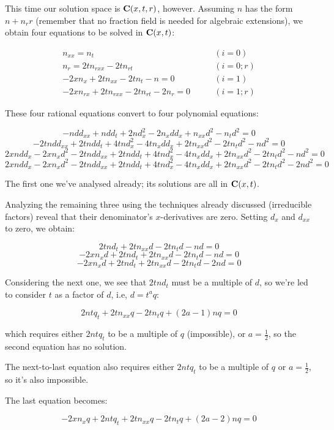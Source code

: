 \documentclass{article}
\newcommand{\C}{\ensuremath{{\bf C}}}
\begin{document}
This time our solution space is $\C(x,t,r)$, however.  Assuming $n$
has the form $n + n_r r$ (remember that no fraction field is needed
for algebraic extensions), we obtain four equations to be solved in $\C(x,t)$:

\begin{align*}
n_{xx} = n_t  & \qquad (i=0) \\
n_r = 2tn_{rxx} -2tn_{rt} & \qquad (i=0; r) \\
-2xn_{x} +2tn_{xx} -2tn_{t} -n = 0 & \qquad (i=1) \\
-2xn_{rx} +2tn_{rxx} -2tn_{rt} -2n_r = 0 & \qquad (i=1; r)
\end{align*}

These four rational equations convert to four polynomial equations:

$$-ndd_{xx} +ndd_t +2nd_x^{2} -2n_xdd_x +n_{xx}d^{2} -n_td^{2} = 0$$
$$-2tndd_{xx} +2tndd_t +4tnd_x^{2} -4tn_xdd_x +2tn_{xx}d^{2} -2tn_td^{2} -nd^{2} = 0$$
$$2xndd_x -2xn_xd^{2} -2tndd_{xx} +2tndd_t +4tnd_x^{2} -4tn_xdd_x +2tn_{xx}d^{2} -2tn_td^{2} -nd^{2} = 0$$
$$2xndd_x -2xn_xd^{2} -2tndd_{xx} +2tndd_t +4tnd_x^{2} -4tn_xdd_x +2tn_{xx}d^{2} -2tn_td^{2} -2nd^{2} = 0$$

The first one we've analysed already; its solutions are all in $\C(x,t)$.

Analyzing the remaining three using the techniques already discussed
(irreducible factors) reveal that their denominator's $x$-derivatives
are zero.  Setting $d_x$ and $d_{xx}$ to zero, we obtain:

$$2tnd_t +2tn_{xx}d -2tn_td -nd = 0$$
$$-2xn_xd +2tnd_t +2tn_{xx}d -2tn_td -nd = 0$$
$$-2xn_xd +2tnd_t +2tn_{xx}d -2tn_td -2nd = 0$$

Considering the next one, we see that $2tnd_t$ must be a multiple of $d$, so we're led to
consider $t$ as a factor of $d$, i.e, $d=t^a q$:

$$2nt q_t + 2tn_{xx}q -2tn_tq +(2a-1)nq = 0$$

which requires either $2ntq_t$ to be a multiple of $q$ (impossible), or $a=\frac{1}{2}$,
so the second equation has no solution.

The next-to-last equation also requires either $2ntq_t$ to be a multiple of $q$ or $a=\frac{1}{2}$, so it's also impossible.

The last equation becomes:


$$-2xn_xq  + 2 n t q_t +2tn_{xx}q -2tn_tq +(2a-2)nq = 0$$
\end{document}
